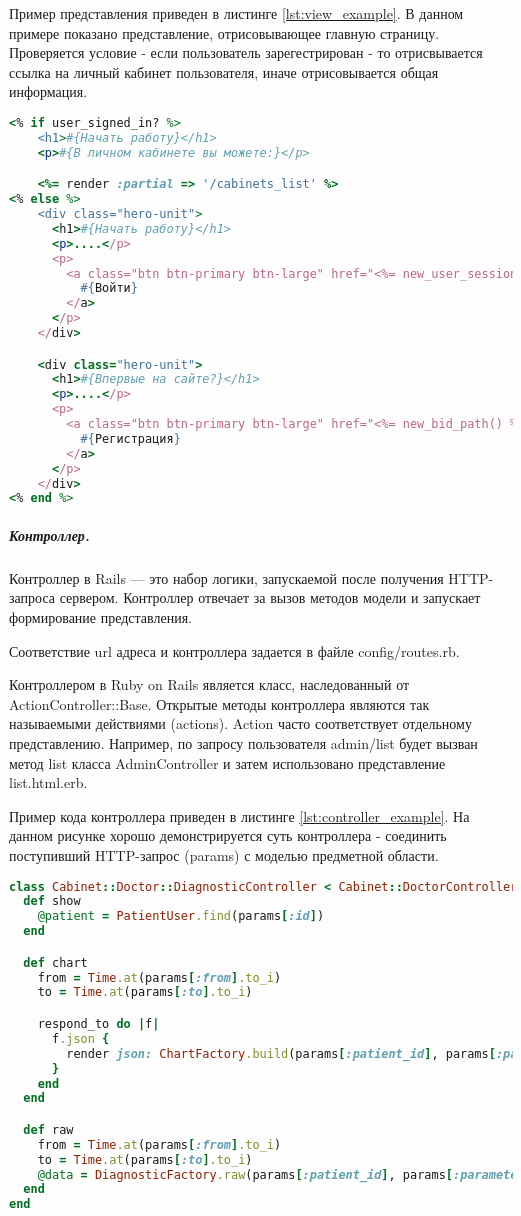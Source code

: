 Пример представления приведен в листинге \ref{lst:view_example}. В данном
примере показано представление, отрисовывающее главную страницу. Проверяется условие - если
пользователь зарегестрирован - то отрисвывается ссылка на личный кабинет
пользователя, иначе отрисовывается общая информация.

\begin{lstlisting}[language=Ruby,caption=Страница приветствия
,label={lst:view_example}] 
<% if user_signed_in? %>
    <h1>#{Начать работу}</h1>
    <p>#{В личном кабинете вы можете:}</p>

    <%= render :partial => '/cabinets_list' %>
<% else %>
    <div class="hero-unit">
      <h1>#{Начать работу}</h1>
      <p>....</p>
      <p>
        <a class="btn btn-primary btn-large" href="<%= new_user_session_path() %>">
          #{Войти}
        </a>
      </p>
    </div>

    <div class="hero-unit">
      <h1>#{Впервые на сайте?}</h1>
      <p>....</p>
      <p>
        <a class="btn btn-primary btn-large" href="<%= new_bid_path() %>">
          #{Регистрация}
        </a>
      </p>
    </div>
<% end %>
\end{lstlisting}

\subparagraph{Контроллер.}
Контроллер в Rails — это набор логики, запускаемой после получения HTTP-запроса
сервером. Контроллер отвечает за вызов методов модели и запускает формирование
представления.

Соответствие url адреса и контроллера задается в файле config/routes.rb.

Контроллером в Ruby on Rails является класс, наследованный от \\
ActionController::Base. Открытые методы контроллера являются так называемыми
действиями (actions). Action часто соответствует отдельному представлению.
Например, по запросу пользователя admin/list будет вызван метод list класса
AdminController и затем использовано представление \\ list.html.erb.

Пример кода контроллера приведен в листинге \ref{lst:controller_example}. На
данном рисунке хорошо демонстрируется суть контроллера - соединить поступивший HTTP-запрос (params) с
моделью предметной области.

\begin{lstlisting}[language=Ruby,caption=Контроллер для приема диагностики
,label={lst:controller_example}] 
class Cabinet::Doctor::DiagnosticController < Cabinet::DoctorController
  def show
    @patient = PatientUser.find(params[:id])
  end

  def chart
    from = Time.at(params[:from].to_i)
    to = Time.at(params[:to].to_i)

    respond_to do |f|
      f.json { 
      	render json: ChartFactory.build(params[:patient_id], params[:parameter_id], from, to) 
      } 
    end
  end

  def raw
    from = Time.at(params[:from].to_i)
    to = Time.at(params[:to].to_i)
    @data = DiagnosticFactory.raw(params[:patient_id], params[:parameter_id], from, to)
  end
end
\end{lstlisting}

